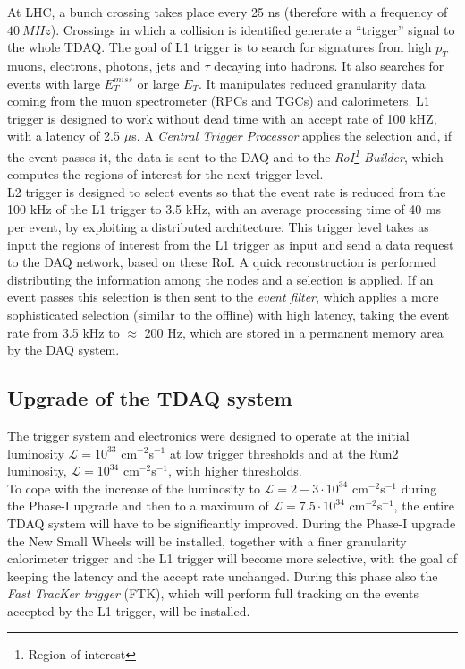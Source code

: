 \documentclass[a4paper,twoside,12pt]{book}
\begin{document}
At LHC, a bunch crossing takes place every 25 ns (therefore with a frequency of $40\ MHz$). Crossings in which a collision is identified generate a ``trigger'' signal to the whole TDAQ. The goal of L1 trigger is to search for signatures from high $p_{T}$ muons, electrons,
photons, jets and $\tau$ decaying into hadrons. It also searches for events with large $E_{T}^{miss}$ or large $E_{T}$. It manipulates reduced granularity data coming from the muon
spectrometer (RPCs and TGCs) and calorimeters. L1 trigger is designed to work without dead time with an accept rate of 100 kHZ, with a latency of 2.5 $\mu$s. A \textit{Central Trigger Processor} applies
the selection and, if the event passes it, the data is
sent to the DAQ and to the \textit{RoI\footnote{Region-of-interest} Builder}, which computes the regions of interest for the next trigger level.\\
L2 trigger is designed to select events so that the event rate is reduced from the 100 kHz of the L1 trigger to 3.5 kHz, with an average processing time of 40 ms per event, by
exploiting a distributed architecture. This trigger
level takes as input the regions of interest from the L1 trigger as input and send a data request to the DAQ network, based on these RoI. A quick reconstruction is performed
distributing the information among the nodes and a selection is applied. If an event passes this selection is then sent to the \textit{event filter}, which applies a more sophisticated selection 
(similar to the offline) with high latency, taking the event rate from 3.5 kHz to $\approx$ 200 Hz, which are stored in a permanent memory area by the DAQ system.

\subsection*{Upgrade of the TDAQ system}
The trigger system and electronics were designed to operate at the initial luminosity 
$\mathcal{L} = 10^{33}$ cm$^{-2}$s$^{-1}$ at low trigger thresholds and at the Run2
luminosity, $\mathcal{L} = 10^{34}$ cm$^{-2}$s$^{-1}$, with higher thresholds\cite{scoping}.\\

To cope with the increase of the luminosity to $\mathcal{L} = 2-3 \cdot 10^{34}$ cm$^{-2}$s$^{-1}$ during
the Phase-I upgrade and then to a maximum of $\mathcal{L} = 7.5 \cdot 10^{34}$ cm$^{-2}$s$^{-1}$, the entire TDAQ system will have to be significantly improved. During the Phase-I upgrade the New Small Wheels will be installed, together with a finer granularity calorimeter
trigger and the L1 trigger will become more selective, with the goal of keeping the latency and the accept rate unchanged. During this phase also the \textit{Fast TracKer trigger} (FTK)\cite{FTK_TDR}, which will perform
full tracking on the events accepted by the L1 trigger, will be installed. \\
\end{document}
